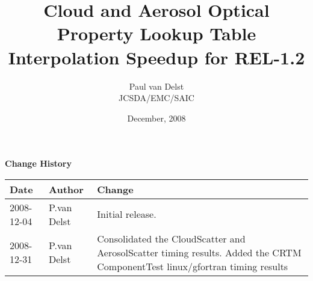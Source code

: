 


\title{Cloud and Aerosol Optical Property Lookup Table Interpolation Speedup for REL-1.2}
\author{Paul van Delst\\JCSDA/EMC/SAIC}
\date{December, 2008}



\maketitle


\thispagestyle{empty}
\vspace*{10cm}
\begin{center}
  {\sffamily\Large\bfseries Change History}
  \begin{table}[htp]
    \centering
    \begin{tabular}{|p{2cm}|p{3cm}|p{8cm}|}
      \hline
      \sffamily\textbf{Date} & \sffamily\textbf{Author} & \sffamily\textbf{Change}\\
      \hline\hline
      2008-12-04 & P.van Delst & Initial release.\\
      \hline
      2008-12-31 & P.van Delst & Consolidated the CloudScatter and AerosolScatter timing results. Added the CRTM ComponentTest linux/gfortran timing results\\
      \hline
    \end{tabular}
  \end{table}
\end{center}
\clearpage
{}
\setcounter{page}{1}








%
%





